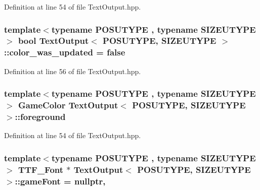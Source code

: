 Definition at line 54 of file Text\-Output.\-hpp.

\hypertarget{class_text_output_abb92f5a8c0c871c8b917f441567d9cae}{
\subsubsection[{color\-\_\-was\-\_\-updated}]{\setlength{\rightskip}{0pt plus 5cm}template$<$typename P\-O\-S\-U\-T\-Y\-P\-E , typename S\-I\-Z\-E\-U\-T\-Y\-P\-E $>$ bool {\bf Text\-Output}$<$ P\-O\-S\-U\-T\-Y\-P\-E, S\-I\-Z\-E\-U\-T\-Y\-P\-E $>$\-::color\-\_\-was\-\_\-updated = false\hspace{0.3cm}{\ttfamily [protected]}}}\label{class_text_output_abb92f5a8c0c871c8b917f441567d9cae}


Definition at line 56 of file Text\-Output.\-hpp.

\hypertarget{class_text_output_a969669fc87e0828685b6b20c4bb79616}{
\subsubsection[{foreground}]{\setlength{\rightskip}{0pt plus 5cm}template$<$typename P\-O\-S\-U\-T\-Y\-P\-E , typename S\-I\-Z\-E\-U\-T\-Y\-P\-E $>$ {\bf Game\-Color} {\bf Text\-Output}$<$ P\-O\-S\-U\-T\-Y\-P\-E, S\-I\-Z\-E\-U\-T\-Y\-P\-E $>$\-::foreground\hspace{0.3cm}{\ttfamily [protected]}}}\label{class_text_output_a969669fc87e0828685b6b20c4bb79616}


Definition at line 54 of file Text\-Output.\-hpp.

\hypertarget{class_text_output_a784e5c34428d43ed01fc5367638df07e}{
\subsubsection[{game\-Font}]{\setlength{\rightskip}{0pt plus 5cm}template$<$typename P\-O\-S\-U\-T\-Y\-P\-E , typename S\-I\-Z\-E\-U\-T\-Y\-P\-E $>$ T\-T\-F\-\_\-\-Font $\ast$ {\bf Text\-Output}$<$ P\-O\-S\-U\-T\-Y\-P\-E, S\-I\-Z\-E\-U\-T\-Y\-P\-E $>$\-::game\-Font = nullptr\hspace{0.3cm}{\ttfamily [static]}, {\ttfamily [protected]}}}\label{class_text_output_a784e5c34428d43ed01fc5367638df07e}


